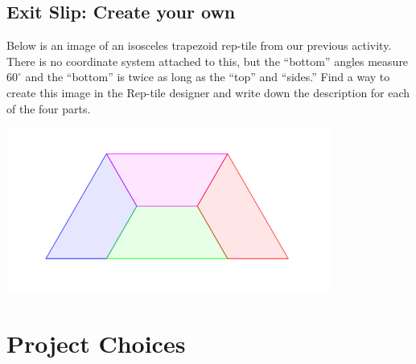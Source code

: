 \wbnewpage

\subsection{Exit Slip: Create your own}

Below is an image of an isosceles trapezoid rep-tile from our previous activity. There is no coordinate system attached to this, but the ``bottom'' angles measure $60^{\circ}$ and the ``bottom'' is twice as long as the ``top'' and ``sides.'' Find a way to create this image in the Rep-tile designer and write down the description for each of the four parts.

\begin{center}
        \includegraphics[width=4.2in]{images/Trap-Reptile}
    \end{center}

\newpage
\section{Project Choices}\label{sec:RatiosProjects}

